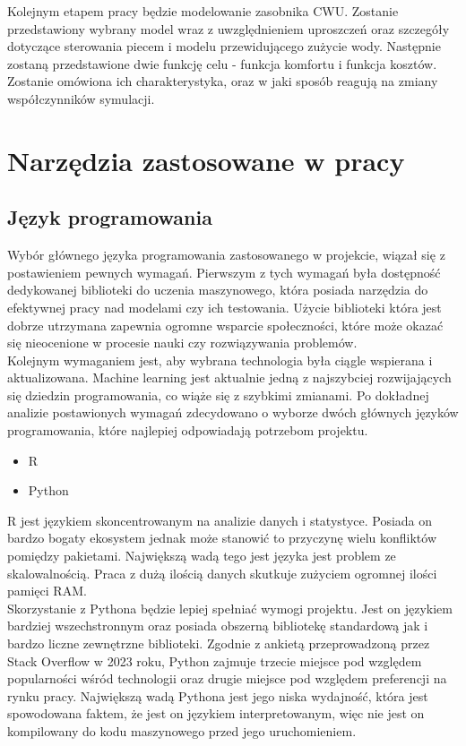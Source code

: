 \documentclass[a4paper,twoside,12pt]{book}
\begin{document}
Kolejnym etapem pracy będzie modelowanie zasobnika CWU. Zostanie przedstawiony wybrany model wraz z uwzględnieniem uproszczeń oraz szczegóły dotyczące sterowania piecem i modelu przewidującego zużycie wody. Następnie zostaną przedstawione dwie funkcję celu - funkcja komfortu i funkcja kosztów. Zostanie omówiona ich charakterystyka, oraz w jaki sposób reagują na zmiany współczynników symulacji.
\newpage



\chapter{Narzędzia zastosowane w pracy}
\label{ch:wymagania-i-narzedzia}
\section{Język programowania}
Wybór głównego języka programowania zastosowanego w projekcie, wiązał się z postawieniem pewnych wymagań. Pierwszym z tych wymagań była dostępność dedykowanej biblioteki do uczenia maszynowego, która posiada narzędzia do efektywnej pracy nad modelami czy ich testowania. Użycie biblioteki która jest dobrze utrzymana zapewnia ogromne wsparcie społeczności, które może okazać się nieocenione w procesie nauki czy rozwiązywania problemów.\\
Kolejnym wymaganiem jest, aby wybrana technologia była ciągle wspierana i aktualizowana. Machine learning jest aktualnie jedną z najszybciej rozwijających się dziedzin programowania, co wiąże się z szybkimi zmianami. Po dokładnej analizie postawionych wymagań zdecydowano o wyborze dwóch głównych języków programowania, które najlepiej odpowiadają potrzebom projektu.
\begin{itemize}
  \item R
  \item Python
\end{itemize}

R jest językiem skoncentrowanym na analizie danych i statystyce. Posiada on bardzo bogaty ekosystem jednak może stanowić to przyczynę wielu konfliktów pomiędzy pakietami. Największą wadą tego jest języka jest problem ze skalowalnością. Praca z dużą ilością danych skutkuje zużyciem ogromnej ilości pamięci RAM.\\ Skorzystanie z Pythona będzie lepiej spełniać wymogi projektu. Jest on językiem bardziej wszechstronnym oraz posiada obszerną bibliotekę standardową jak i bardzo liczne zewnętrzne biblioteki. Zgodnie z ankietą przeprowadzoną przez Stack Overflow w 2023 roku\cite{bib:Stack}, Python zajmuje trzecie miejsce pod względem popularności wśród technologii oraz drugie miejsce pod względem preferencji na rynku pracy. Największą wadą Pythona jest jego niska wydajność, która jest spowodowana faktem, że jest on językiem interpretowanym, więc nie jest on kompilowany do kodu maszynowego przed jego uruchomieniem.
\end{document}
